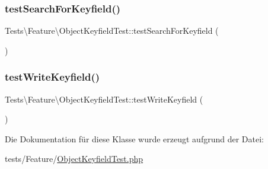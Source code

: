 \subsubsection{\texorpdfstring{test\+Search\+For\+Keyfield()}{testSearchForKeyfield()}}
{\footnotesize\ttfamily Tests\textbackslash{}\+Feature\textbackslash{}\+Object\+Keyfield\+Test\+::test\+Search\+For\+Keyfield (\begin{DoxyParamCaption}{ }\end{DoxyParamCaption})}

\mbox{\label{classTests_1_1Feature_1_1ObjectKeyfieldTest_abeedf995352f3f94a7c43918fe08ff5a}} 
\subsubsection{\texorpdfstring{test\+Write\+Keyfield()}{testWriteKeyfield()}}
{\footnotesize\ttfamily Tests\textbackslash{}\+Feature\textbackslash{}\+Object\+Keyfield\+Test\+::test\+Write\+Keyfield (\begin{DoxyParamCaption}{ }\end{DoxyParamCaption})}



Die Dokumentation für diese Klasse wurde erzeugt aufgrund der Datei\+:\begin{DoxyCompactItemize}
\item 
tests/\+Feature/\hyperlink{ObjectKeyfieldTest_8php}{Object\+Keyfield\+Test.\+php}\end{DoxyCompactItemize}
